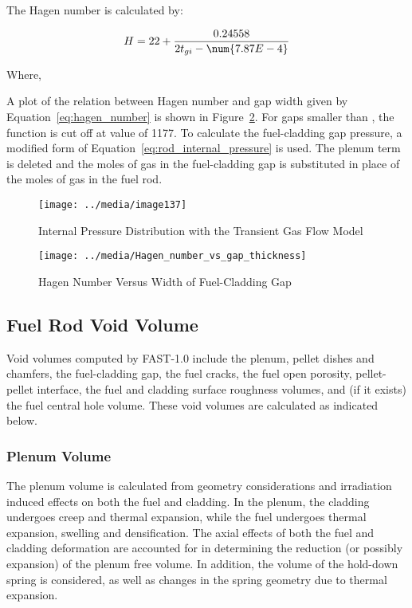 The Hagen number is calculated by:

\begin{equation}
    \label{eq:hagen_number}
    H = 22 + \frac{0.24558}{2t_{gi} -\num{7.87E- 4}}
\end{equation}

Where, 


A plot of the relation between Hagen number and gap width given by Equation~\ref{eq:hagen_number} is
shown in Figure~\ref{fig:hagen_number}.  For gaps smaller than , the function is
cut off at value of 1177. To calculate the fuel-cladding gap pressure, a modified form of
Equation~\ref{eq:rod_internal_pressure} is used. The plenum term is deleted and the moles of gas in
the fuel-cladding gap is substituted in place of the moles of gas in the fuel rod.

\begin{figure}
    \texttt{[image: ../media/image137]}
    \caption{Internal Pressure Distribution with the Transient Gas Flow Model}
    \label{fig:internal_pressure_distribution_transient_gas_flow_model}
\end{figure}

\begin{figure}
 \texttt{[image: ../media/Hagen\_number\_vs\_gap\_thickness]}
 \caption{Hagen Number Versus Width of Fuel-Cladding Gap}
 \label{fig:hagen_number}
\end{figure}

\subsection{Fuel Rod Void Volume} \label{section:fuel-rod-void-volume}

Void volumes computed by FAST-1.0 include the plenum, pellet dishes and chamfers, the fuel-cladding
gap, the fuel cracks, the fuel open porosity, pellet-pellet interface, the fuel and cladding surface
roughness volumes, and (if it exists) the fuel central hole volume. These void volumes are
calculated as indicated below.

\subsubsection{Plenum Volume} \label{section:plenum-volume}

The plenum volume is calculated from geometry considerations and irradiation induced effects on both
the fuel and cladding. In the plenum, the cladding undergoes creep and thermal expansion, while the
fuel undergoes thermal expansion, swelling and densification. The axial effects of both the fuel and
cladding deformation are accounted for in determining the reduction (or possibly expansion) of the
plenum free volume.  In addition, the volume of the hold-down spring is considered, as well as
changes in the spring geometry due to thermal expansion.

